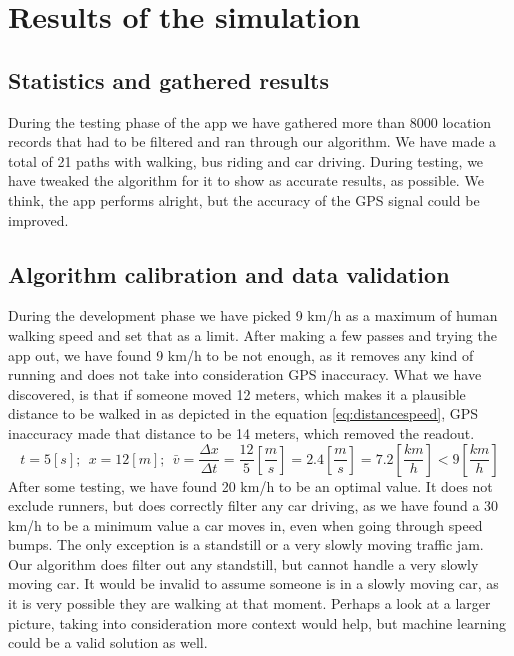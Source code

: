 \chapter{Results of the simulation}
\section{Statistics and gathered results}

During the testing phase of the app we have gathered more than 8000 location records that had to be filtered and ran through our algorithm. We have made a total of 21 paths with walking, bus riding and car driving. During testing, we have tweaked the algorithm for it to show as accurate results, as possible. We think, the app performs alright, but the accuracy of the GPS signal could be improved.

\section{Algorithm calibration and data validation}

During the development phase we have picked 9 km/h as a maximum of human walking speed and set that as a limit. After making a few passes and trying the app out, we have found 9 km/h to be not enough, as it removes any kind of running and does not take into consideration GPS inaccuracy. What we have discovered, is that if someone moved 12 meters, which makes it a plausible distance to be walked in as depicted in the equation \ref{eq:distancespeed}, GPS inaccuracy made that distance to be 14 meters, which removed the readout.
\begin{equation} \label{eq:distancespeed}
    t = 5[s];~~ x = 12[m];~~ \bar{v} = \frac{\Delta x}{\Delta t} = \frac{12}{5} [\frac{m}{s}] = 2.4 [\frac{m}{s}] = 7.2 [\frac{km}{h}] < 9 [\frac{km}{h}]
\end{equation}
After some testing, we have found 20 km/h to be an optimal value. It does not exclude runners, but does correctly filter any car driving, as we have found a 30 km/h to be a minimum value a car moves in, even when going through speed bumps. The only exception is a standstill or a very slowly moving traffic jam. Our algorithm does filter out any standstill, but cannot handle a very slowly moving car. It would be invalid to assume someone is in a slowly moving car, as it is very possible they are walking at that moment. Perhaps a look at a larger picture, taking into consideration more context would help, but machine learning could be a valid solution as well.

